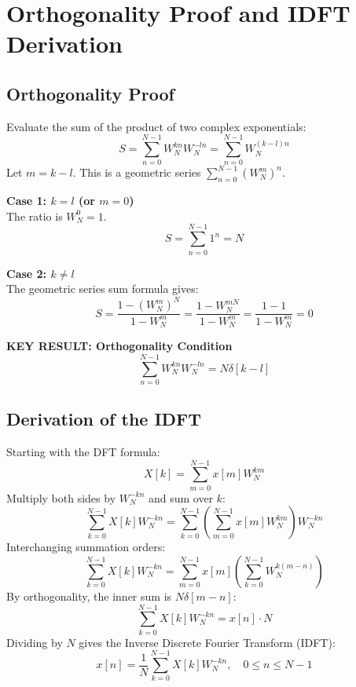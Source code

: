 \documentclass[11pt,a4paper]{article}
\begin{document}
\section{Orthogonality Proof and IDFT Derivation}

\subsection{Orthogonality Proof}
Evaluate the sum of the product of two complex exponentials:
\begin{equation}
S = \sum_{n=0}^{N-1} W_N^{kn} W_N^{-ln} = \sum_{n=0}^{N-1} W_N^{(k-l)n}
\end{equation}
Let $m = k - l$. This is a geometric series $\sum_{n=0}^{N-1} (W_N^m)^n$.

\textbf{Case 1: $k = l$ (or $m = 0$)}\\
The ratio is $W_N^0 = 1$.
\begin{equation*}
S = \sum_{n=0}^{N-1} 1^n = N
\end{equation*}

\textbf{Case 2: $k \neq l$}\\
The geometric series sum formula gives:
\begin{equation*}
S = \frac{1 - (W_N^m)^N}{1 - W_N^m} = \frac{1 - W_N^{mN}}{1 - W_N^m} = \frac{1 - 1}{1 - W_N^m} = 0
\end{equation*}

\textbf{KEY RESULT: Orthogonality Condition}
\begin{equation}
\sum_{n=0}^{N-1} W_N^{kn} W_N^{-ln} = N \delta[k-l]
\end{equation}

\subsection{Derivation of the IDFT}
Starting with the DFT formula:
\begin{equation*}
X[k] = \sum_{m=0}^{N-1} x[m] W_N^{km}
\end{equation*}
Multiply both sides by $W_N^{-kn}$ and sum over $k$:
\begin{equation*}
\sum_{k=0}^{N-1} X[k] W_N^{-kn} = \sum_{k=0}^{N-1} \left( \sum_{m=0}^{N-1} x[m] W_N^{km} \right) W_N^{-kn}
\end{equation*}
Interchanging summation orders:
\begin{equation*}
\sum_{k=0}^{N-1} X[k] W_N^{-kn} = \sum_{m=0}^{N-1} x[m] \left( \sum_{k=0}^{N-1} W_N^{k(m-n)} \right)
\end{equation*}
By orthogonality, the inner sum is $N \delta[m-n]$:
\begin{equation*}
\sum_{k=0}^{N-1} X[k] W_N^{-kn} = x[n] \cdot N
\end{equation*}
Dividing by $N$ gives the Inverse Discrete Fourier Transform (IDFT):
\begin{equation}
x[n] = \frac{1}{N} \sum_{k=0}^{N-1} X[k] W_N^{-kn}, \quad 0 \le n \le N-1
\end{equation}
\end{document}
